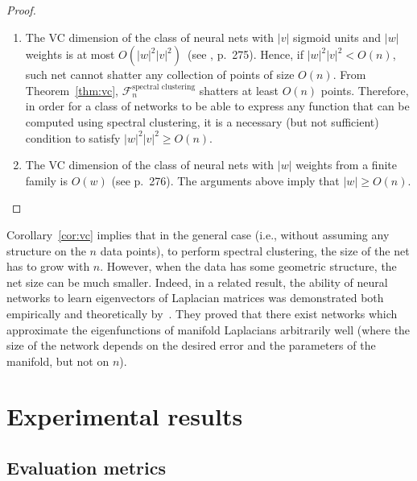 \documentclass{article} %
\begin{document}
\begin{proof}~\\[-0.6cm]
\begin{enumerate}
\item The VC dimension of the class of neural nets with $|v|$ sigmoid units and $|w|$ weights is at most $O(|w|^2|v|^2)$~(see \citep{shalev2014understanding}, p.~275). Hence, if $|w|^2|v|^2 < O(n)$, such net cannot shatter any collection of points of size $O(n)$.
From Theorem~\ref{thm:vc}, $\mathcal{F}^\text{spectral clustering}_n$ shatters at least  $O(n)$ points.
Therefore, in order for a class of networks to be able to express any function that can be computed using spectral clustering, it is a necessary (but not sufficient) condition to satisfy $|w|^2|v|^2\ge O(n)$.
\item The VC dimension of the class of neural nets with $|w|$ weights from a finite family is $O(w)$ (see \citep{shalev2014understanding} p.~276). The arguments above imply that $|w| \ge O(n)$.
\end{enumerate}
\end{proof}

Corollary~\ref{cor:vc} implies that in the general case (i.e., without assuming any structure on the $n$ data points), to perform spectral clustering, the size of the net has to grow with $n$.
However, when the data has some geometric structure, the net size can be much smaller.
Indeed, in a related result, the ability of neural networks to learn eigenvectors of Laplacian matrices was demonstrated both empirically and theoretically by~\citet{mishne2017diffusion}.
They proved that there exist networks which approximate the eigenfunctions of manifold Laplacians arbitrarily well (where the size of the network depends on the desired error and the parameters of the manifold, but not on $n$).


\section {Experimental results}\label{sec:experiments}

\subsection {Evaluation metrics}
\end{document}
